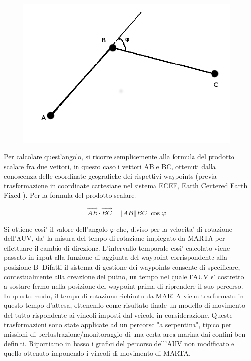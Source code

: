 \documentclass[Lau,binding=0.6cm]{sapthesis}
\begin{document}
\begin{figure}[H]
    \centering
	\includegraphics[scale=0.5]{scalarprod.png}
\end{figure}

Per calcolare quest'angolo, si ricorre semplicemente alla formula del prodotto scalare fra due vettori, in questo caso i vettori AB e BC, ottenuti dalla conoscenza delle coordinate geografiche dei rispettivi waypoints (previa trasformazione in coordinate cartesiane nel sistema ECEF, Earth Centered Earth Fixed ). Per la formula del prodotto scalare:


\begin{equation}
\overrightarrow{AB} \cdot \overrightarrow{BC} = |AB| |BC| \cos{\varphi}    
\end{equation}

 
Si ottiene cosi' il valore dell'angolo $\varphi$ che, diviso per la velocita' di rotazione dell'AUV, da' la misura del tempo di rotazione impiegato da MARTA per effettuare il cambio di direzione. \newline L'intervallo temporale cosi' calcolato viene passato in input alla funzione di aggiunta del waypoint corrispondente alla posizione B.
 Difatti il sistema di gestione dei waypoints consente di specificare, contestualmente alla creazione del putno, un tempo nel quale l'AUV e' costretto a sostare fermo nella posizione del waypoint prima di riprendere il suo percorso. In questo modo, il tempo di rotazione richiesto da MARTA viene trasformato in questo tempo d'attesa, ottenendo come risultato finale un modello di movimento del tutto rispondente ai vincoli imposti dal veicolo in considerazione.\newline
Queste trasformazioni sono state applicate ad un percorso "a serpentina", tipico per missioni di perlustrazione/monitoraggio di una certa area marina dai confini ben definiti. Riportiamo in basso i grafici del percorso dell'AUV non modificato e quello ottenuto imponendo i vincoli di movimento di MARTA.
\end{document}
